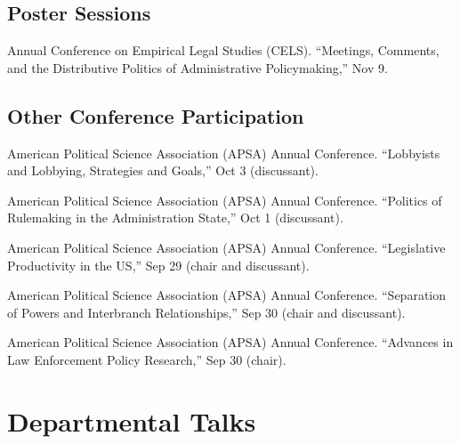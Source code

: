 \documentclass[12pt,letterpaper]{report}
\newcommand{\talk}[4]{\item[#1]{\tab{}#3. \enquote{#2,} #4.}} %
\newcommand{\APSA}{American Political Science Association (APSA) Annual Conference}
\begin{document}
    \subsection*{Poster Sessions}
    \begin{tablist}
    \talk{2018}{Meetings, Comments, and the Distributive Politics of Administrative Policymaking}{Annual Conference on Empirical Legal Studies (CELS)}{Nov 9}
    \end{tablist}

    \subsection*{Other Conference Participation}
    \begin{tablist}
    \talk{2021}{Lobbyists and Lobbying, Strategies and Goals}{\APSA}{Oct 3 (discussant)}    
    \talk{2021}{Politics of Rulemaking in the Administration State}{\APSA}{Oct 1 (discussant)}    
    \talk{2021}{Legislative Productivity in the US}{\APSA}{Sep 29 (chair and discussant)}
    \talk{2021}{Separation of Powers and Interbranch Relationships}{\APSA}{Sep 30 (chair and discussant)}
    \talk{2021}{Advances in Law Enforcement Policy Research}{\APSA}{Sep 30 (chair)}
    \end{tablist}


    \section*{Departmental Talks}
\end{document}

